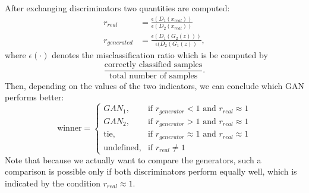 After exchanging discriminators two quantities are computed:
\begin{align}
	r_{real} &= \frac{\epsilon(D_1(x_{real}))}{\epsilon(D_2(x_{real}))} \\
	r_{generated} &= \frac{\epsilon(D_1(G_2(z)))}{\epsilon(D_2(G_1(z))}, 
\end{align}
where $\epsilon(\cdot)$ denotes the misclassification ratio which is be computed by 
\begin{equation*}
	\frac{\text{correctly classified samples}}{\text{total number of samples}}.
\end{equation*} 
Then, depending on the values of the two indicators, we can conclude which GAN performs better:
\begin{equation}
\text{winner} = \begin{cases}
	GAN_1, & \text{if } r_{generator} < 1 \text{ and } r_{real} \approx 1 \\
	GAN_2, & \text{if } r_{generator} > 1 \text{ and } r_{real} \approx 1 \\
	\text{tie}, & \text{if } r_{generator} \approx 1 \text{ and } r_{real} \approx 1  \\
	\text{undefined}, & \text{if } r_{real} \neq 1	
	\end{cases}
\end{equation}
Note that because we actually want to compare the generators, such a comparison is possible only if both discriminators perform equally well, which is indicated by the condition $r_{real} \approx 1$.  
